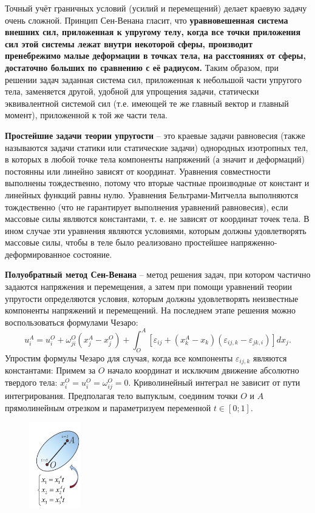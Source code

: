 Точный учёт граничных условий (усилий и перемещений) делает краевую
задачу очень сложной. Принцип Сен-Венана гласит, что \textbf{уравновешенная
система внешних сил, приложенная к упругому телу, когда все точки
приложения сил этой системы лежат внутри некоторой сферы, производит
пренебрежимо малые деформации в точках тела, на расстояниях от
сферы, достаточно больших по сравнению с её радиусом.} Таким образом,
при решении задач заданная система сил, приложенная к небольшой части
упругого тела, заменяется другой, удобной для упрощения задачи,
статически эквивалентной системой сил (т.е. имеющей те же главный
вектор и главный момент), приложенной к той же части тела.


\textbf{Простейшие задачи теории упругости} – это краевые задачи равновесия (также называются задачи статики или статические задачи) однородных изотропных тел, в которых в любой точке тела
компоненты напряжений (а значит и деформаций) постоянны или линейно зависят от координат.
Уравнения совместности выполнены тождественно, потому что вторые частные производные от констант
и линейных функций равны нулю. Уравнения Бельтрами-Митчелла выполняются тождественно (что не гарантирует выполнения уравнений равновесия), если
массовые силы являются константами, т. е. не зависят от координат точек тела. В ином случае эти
уравнения являются условиями, которым должны удовлетворять массовые силы, чтобы в теле было
реализовано простейшее напряженно-деформированное состояние.


\textbf{Полуобратный метод Сен-Венана} – метод решения задач, при котором частично задаются напряжения и
перемещения, а затем при помощи уравнений теории упругости определяются условия, которым должны
удовлетворять неизвестные компоненты напряжений и перемещений. На последнем этапе решения
можно воспользоваться формулами Чезаро:
$$
u_i^A=u_i^O+\omega_{j i}^O\left(x_j^A-x_j^O\right)+\int_O^A\left[\varepsilon_{i j}+\left(x_k^A-x_k\right)\left(\varepsilon_{i j, k}-\varepsilon_{j k, i}\right)\right] d x_j.
$$
Упростим формулы Чезаро для случая, когда все компоненты $\varepsilon_{i j, k}$ являются константами: 
Примем за $O$ начало координат и исключим движение абсолютно твердого тела: $x_i^O=u_i^O=\omega_{i j}^O=0$.
Криволинейный интеграл не зависит от пути интегрирования. Предполагая тело выпуклым, соединим точки $O$ и $A$ прямолинейным отрезком и параметризуем переменной $t \in[0 ; 1]$.

\begin{figure}[h!]
  \centering
  \includegraphics[width=0.2\textwidth]{images/14.2.jpg}
\end{figure}


